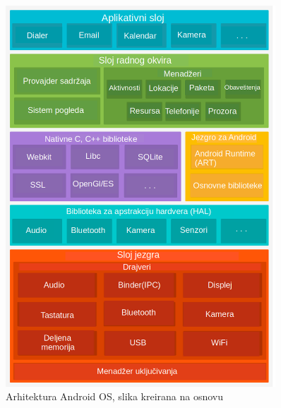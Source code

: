 \documentclass[android.tex]{subfiles}
\begin{document}
\begin{figure}[!ht]
  \centering
  \label{fig:arhitektura}
  \includegraphics[width=0.9\textwidth]{arhitekturaSrp.png}
  \caption{Arhitektura Android OS, slika kreirana na osnovu \cite{sajt:androidDevelopersArhitektura}}
\end{figure}
\end{document}
